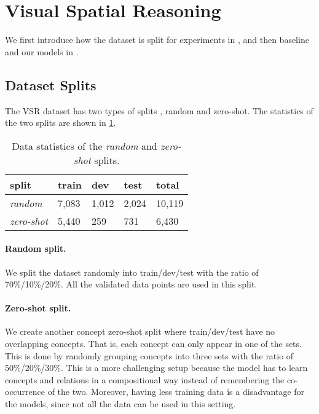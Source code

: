 


\section{Visual Spatial Reasoning}

We first introduce how the dataset is split for experiments in , and then baseline and our models in .

\subsection{Dataset Splits}\label{sec:vsr_splits}

The VSR dataset has two types of splits \cite{liu2022visual}, random and zero-shot. The statistics of the two splits are shown in \cref{tab:data_splits}.

\begin{table}[ht]
\small
\centering
\begin{tabular}{lllll}
\toprule
 split & train & dev & test & total   \\
\midrule
\textit{random} & 7,083 & 1,012 & 2,024 & 10,119 \\
\textit{zero-shot} & 5,440 & 259 & 731  & 6,430\\
\bottomrule
\end{tabular}
\caption{Data statistics of the \textit{random} and \textit{zero-shot} splits. }
\label{tab:data_splits}
\end{table}

\paragraph{Random split.}
We split the dataset randomly into train/dev/test with the ratio of 70\%/10\%/20\%. All the validated data points are used in this split.

\paragraph{Zero-shot split.}
We create another concept zero-shot split where train/dev/test have no overlapping concepts. That is, each concept can only appear in one of the sets.
This is done by randomly grouping concepts into three sets with the ratio of 50\%/20\%/30\%.
This is a more challenging setup because the model has to learn concepts and relations in a compositional way instead of remembering the co-occurrence of the two.
Moreover, having less training data is a disadvantage for the models, since not all the data can be used in this setting.

